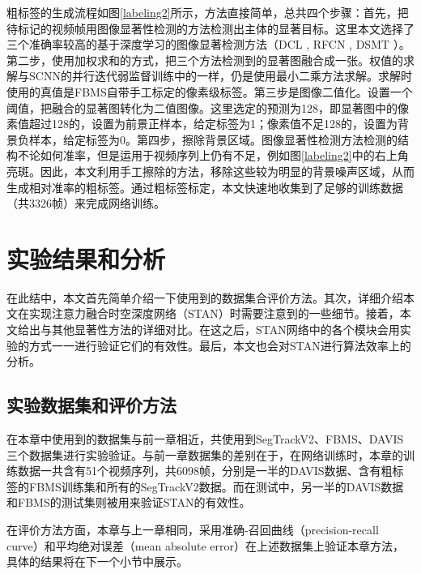 粗标签的生成流程如图\ref{labeling2}所示，方法直接简单，总共四个步骤：首先，把待标记的视频帧用图像显著性检测的方法检测出主体的显著目标。这里本文选择了三个准确率较高的基于深度学习的图像显著检测方法（DCL \cite{li2016deep}, RFCN \cite{wang2016saliency}, DSMT \cite{li2016deepsaliency}）。第二步，使用加权求和的方式，把三个方法检测到的显著图融合成一张。权值的求解与SCNN的并行迭代弱监督训练中的一样，仍是使用最小二乘方法求解。求解时使用的真值是FBMS自带手工标定的像素级标签。第三步是图像二值化。设置一个阈值，把融合的显著图转化为二值图像。这里选定的预测为128，即显著图中的像素值超过128的，设置为前景正样本，给定标签为1；像素值不足128的，设置为背景负样本，给定标签为0。第四步，擦除背景区域。图像显著性检测方法检测的结构不论如何准率，但是运用于视频序列上仍有不足，例如图\ref{labeling2}中的右上角亮斑。因此，本文利用手工擦除的方法，移除这些较为明显的背景噪声区域，从而生成相对准率的粗标签。通过粗标签标定，本文快速地收集到了足够的训练数据（共3326帧）来完成网络训练。


\section{实验结果和分析}
在此结中，本文首先简单介绍一下使用到的数据集合评价方法。其次，详细介绍本文在实现注意力融合时空深度网络（STAN）时需要注意到的一些细节。接着，本文给出与其他显著性方法的详细对比。在这之后，STAN网络中的各个模块会用实验的方式一一进行验证它们的有效性。最后，本文也会对STAN进行算法效率上的分析。

\subsection{实验数据集和评价方法}
在本章中使用到的数据集与前一章相近，共使用到SegTrackV2、FBMS、DAVIS三个数据集进行实验验证。与前一章数据集的差别在于，在网络训练时，本章的训练数据一共含有51个视频序列，共6098帧，分别是一半的DAVIS数据、含有粗标签的FBMS训练集和所有的SegTrackV2数据。而在测试中，另一半的DAVIS数据和FBMS的测试集则被用来验证STAN的有效性。

在评价方法方面，本章与上一章相同，采用准确-召回曲线（precision-recall curve）和平均绝对误差（mean absolute error）在上述数据集上验证本章方法，具体的结果将在下一个小节中展示。

